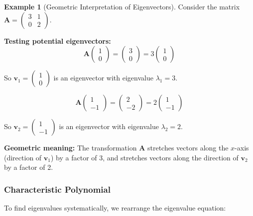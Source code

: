 \documentclass[12pt]{article}
\numberwithin{equation}{section}
\newcommand{\vect}[1]{\boldsymbol{#1}}   %
\newcommand{\mat}[1]{\mathbf{#1}}        %
\theoremstyle{plain}
\theoremstyle{definition}
\newtheorem{example}[theorem]{Example}
\theoremstyle{remark}
\begin{document}
\begin{example}[Geometric Interpretation of Eigenvectors]
Consider the matrix $\mat{A} = \begin{pmatrix} 3 & 1 \\ 0 & 2 \end{pmatrix}$.

\textbf{Testing potential eigenvectors:}
$$\mat{A}\begin{pmatrix} 1 \\ 0 \end{pmatrix} = \begin{pmatrix} 3 \\ 0 \end{pmatrix} = 3\begin{pmatrix} 1 \\ 0 \end{pmatrix}$$

So $\vect{v}_1 = \begin{pmatrix} 1 \\ 0 \end{pmatrix}$ is an eigenvector with eigenvalue $\lambda_1 = 3$.

$$\mat{A}\begin{pmatrix} 1 \\ -1 \end{pmatrix} = \begin{pmatrix} 2 \\ -2 \end{pmatrix} = 2\begin{pmatrix} 1 \\ -1 \end{pmatrix}$$

So $\vect{v}_2 = \begin{pmatrix} 1 \\ -1 \end{pmatrix}$ is an eigenvector with eigenvalue $\lambda_2 = 2$.

\textbf{Geometric meaning:} The transformation $\mat{A}$ stretches vectors along the $x$-axis (direction of $\vect{v}_1$) by a factor of 3, and stretches vectors along the direction of $\vect{v}_2$ by a factor of 2.
\end{example}

\subsubsection{Characteristic Polynomial}

To find eigenvalues systematically, we rearrange the eigenvalue equation:
\end{document}
